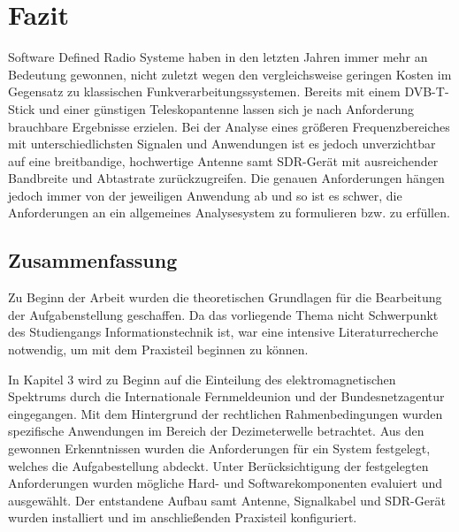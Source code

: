 
\chapter{Fazit}
Software Defined Radio Systeme haben in den letzten Jahren immer mehr an Bedeutung gewonnen, nicht zuletzt wegen den vergleichsweise geringen Kosten im Gegensatz zu klassischen Funkverarbeitungssystemen.
Bereits mit einem DVB-T-Stick und einer günstigen Teleskopantenne lassen sich je nach Anforderung brauchbare Ergebnisse erzielen. Bei der Analyse eines größeren Frequenzbereiches mit unterschiedlichsten Signalen und Anwendungen ist es jedoch unverzichtbar auf eine breitbandige, hochwertige Antenne samt SDR-Gerät mit ausreichender Bandbreite und Abtastrate zurückzugreifen. Die genauen Anforderungen hängen jedoch immer von der jeweiligen Anwendung ab und so ist es schwer, die Anforderungen an ein allgemeines Analysesystem zu formulieren bzw. zu erfüllen.



\section{Zusammenfassung}
Zu Beginn der Arbeit wurden die theoretischen Grundlagen für die Bearbeitung der Aufgabenstellung geschaffen. Da das vorliegende Thema nicht Schwerpunkt des Studiengangs Informationstechnik ist, war eine intensive Literaturrecherche notwendig, um mit dem Praxisteil beginnen zu können.

In Kapitel 3 wird zu Beginn auf die Einteilung des elektromagnetischen Spektrums durch die Internationale Fernmeldeunion und der Bundesnetzagentur eingegangen. Mit dem Hintergrund der  rechtlichen Rahmenbedingungen wurden spezifische Anwendungen im Bereich der Dezimeterwelle betrachtet. Aus den gewonnen Erkenntnissen wurden die Anforderungen für ein System festgelegt, welches die Aufgabestellung abdeckt. Unter Berücksichtigung der festgelegten Anforderungen wurden mögliche Hard- und Softwarekomponenten evaluiert und ausgewählt. Der entstandene Aufbau samt Antenne, Signalkabel und SDR-Gerät wurden installiert und im anschließenden Praxisteil konfiguriert.




